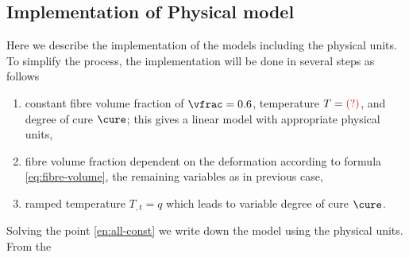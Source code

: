 \documentclass[twoside,a4paper,12pt]{article}
\newcommand{\QM}{{\color{red}(?)}}
\begin{document}
\subsection{Implementation of Physical model}

Here we describe the implementation of the models including the
physical units. To simplify the process, the implementation will be
done in several steps as follows
%
\begin{enumerate}
\item constant fibre volume fraction of $\vfrac = 0.6$, temperature $T=\QM$, and degree of cure $\cure$; this gives a linear model with appropriate physical units, \label{en:all-const}
\item fibre volume fraction dependent on the deformation according to formula \eqref{eq:fibre-volume}, the remaining variables as in previous case,
\item ramped temperature $T_{,t} = q$ which leads to variable degree of cure $\cure$.
\end{enumerate}

Solving the point \ref{en:all-const} we write down the model using the physical units. From the 




\end{document}
